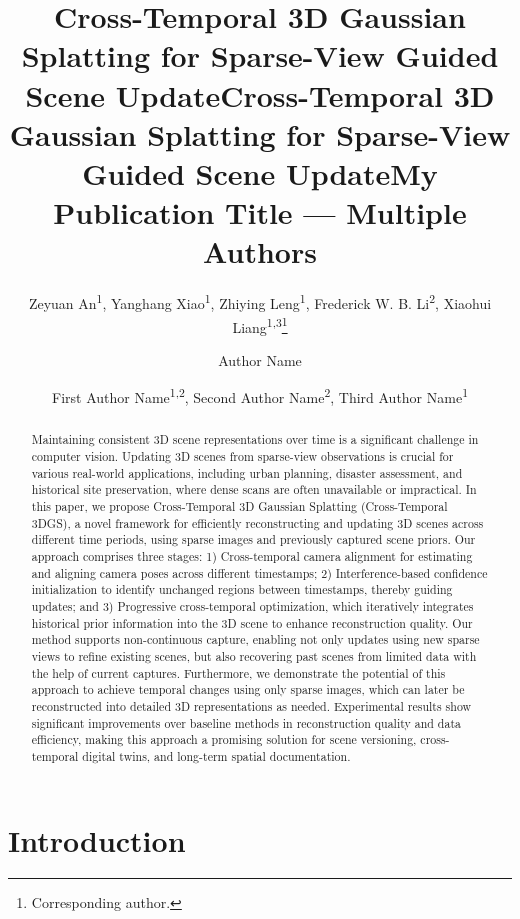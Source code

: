 \documentclass[letterpaper]{article} %
\title{Cross-Temporal 3D Gaussian Splatting for Sparse-View Guided Scene Update}
\author{
    Zeyuan An\textsuperscript{\rm 1},
    Yanghang Xiao\textsuperscript{\rm 1},
    Zhiying Leng\textsuperscript{\rm 1},
    Frederick W. B. Li\textsuperscript{\rm 2},
    Xiaohui Liang\textsuperscript{\rm 1,\rm 3}\thanks{Corresponding author.}
}
\title{Cross-Temporal 3D Gaussian Splatting for Sparse-View Guided Scene Update}
\author {
    Author Name
}
\title{My Publication Title --- Multiple Authors}
\author {
    First Author Name\textsuperscript{\rm 1,\rm 2},
    Second Author Name\textsuperscript{\rm 2},
    Third Author Name\textsuperscript{\rm 1}
}
\begin{document}
\maketitle

\begin{abstract}
Maintaining consistent 3D scene representations over time is a significant challenge in computer vision. 
Updating 3D scenes from sparse-view observations is crucial for various real-world applications, including urban planning, disaster assessment, and historical site preservation, where dense scans are often unavailable or impractical. In this paper, we propose Cross-Temporal 3D Gaussian Splatting (Cross-Temporal 3DGS), a novel framework for efficiently reconstructing and updating 3D scenes across different time periods, using sparse images and previously captured scene priors. 
Our approach comprises three stages: 1) Cross-temporal camera alignment for estimating and aligning camera poses across different timestamps; 2) Interference-based confidence initialization to identify unchanged regions between timestamps, thereby guiding updates; and 3) Progressive cross-temporal optimization, which iteratively integrates historical prior information into the 3D scene to enhance reconstruction quality.
Our method supports non-continuous capture, enabling not only updates using new sparse views to refine existing scenes, but also recovering past scenes from limited data with the help of current captures. Furthermore, we demonstrate the potential of this approach to achieve temporal changes using only sparse images, which can later be reconstructed into detailed 3D representations as needed. Experimental results show significant improvements over baseline methods in reconstruction quality and data efficiency, making this approach a promising solution for scene versioning, cross-temporal digital twins, and long-term spatial documentation.
\end{abstract}



\section{Introduction}
\end{document}
